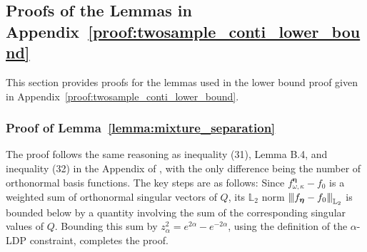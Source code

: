 \documentclass[twoside,11pt]{article}
\newcommand{\Ell}{\mathbb{L}}
\newcommand{\EllTwo}{\Ell_2} %
\newcommand{\vertiii}[1]{
	{\left\vert\kern-0.25ex\left\vert\kern-0.25ex\left\vert #1 
		\right\vert\kern-0.25ex\right\vert\kern-0.25ex\right\vert}
}%
\newcommand{\privacyMechanism}{Q}
\newcommand{\privacyParameter}{\alpha} %
\newcommand{\binNum}{\kappa}           %
\begin{document}
\begin{appendix}
	\subsection{Proofs of the Lemmas in Appendix~\ref{proof:twosample_conti_lower_bound}}
	This section provides proofs for the lemmas used in the lower bound proof given in Appendix~\ref{proof:twosample_conti_lower_bound}.
	\subsubsection{Proof of Lemma~\ref{lemma:mixture_separation}}\label{proof:mixture_separation}
	The proof follows the same reasoning as inequality (31), Lemma B.4, and inequality (32) in the Appendix of \citet{Lam-Weil2021MinimaxConstraint}, with the only difference being the number of orthonormal basis functions. The key steps are as follows: Since \( f^{{\boldsymbol{\eta}}}_{\omega, \binNum} - f_0 \) is a weighted sum of orthonormal singular vectors of \(\privacyMechanism\), its \(\EllTwo\) norm \( \vertiii{f_{{\boldsymbol{\eta}}} - f_0}_{\EllTwo} \) is bounded below by a quantity involving the sum of the corresponding singular values of \(\privacyMechanism\). Bounding this sum  by \( z_\privacyParameter^2 = e^{2\alpha} - e^{-2\alpha} \), using the definition of the \(\privacyParameter\)-LDP constraint, completes the proof.

\end{appendix}
\end{document}
